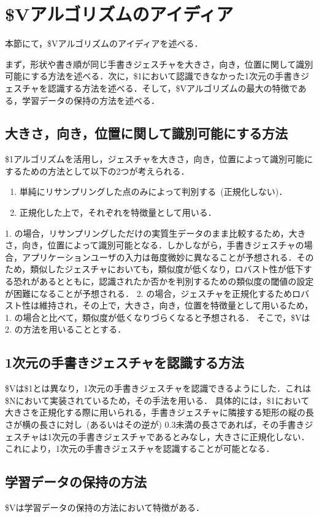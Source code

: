 \section{\$Vアルゴリズムのアイディア}
本節にて，\$Vアルゴリズムのアイディアを述べる．

まず，形状や書き順が同じ手書きジェスチャを大きさ，向き，位置に関して識別可能にする方法を述べる．次に，\$1において認識できなかった1次元の手書きジェスチャを認識する方法を述べる．そして，\$Vアルゴリズムの最大の特徴である，学習データの保持の方法を述べる．

\subsection{大きさ，向き，位置に関して識別可能にする方法}
\$1アルゴリズムを活用し，ジェスチャを大きさ，向き，位置によって識別可能にするための方法として以下の2つが考えられる．
\begin{enumerate}
\item 単純にリサンプリングした点のみによって判別する~(正規化しない)．
\item 正規化した上で，それぞれを特徴量として用いる．
\end{enumerate}
1. の場合，リサンプリングしただけの実質生データのまま比較するため，大きさ，向き，位置によって識別可能となる．しかしながら，手書きジェスチャの場合，アプリケーションユーザの入力は毎度微妙に異なることが予想される．そのため，類似したジェスチャにおいても，類似度が低くなり，ロバスト性が低下する恐れがあるとともに，認識されたか否かを判別するための類似度の閾値の設定が困難になることが予想される．
2. の場合，ジェスチャを正規化するためロバスト性は維持され，その上で，大きさ，向き，位置を特徴量として用いるため，1. の場合と比べて，類似度が低くなりづらくなると予想される．
そこで，\$Vは2. の方法を用いることとする．

\subsection{1次元の手書きジェスチャを認識する方法}
\$Vは\$1とは異なり，1次元の手書きジェスチャを認識できるようにした．これは\$N\cite{Anthony:2010:LMR:1839214.1839258}において実装されているため，その手法を用いる．
具体的には，\$1において大きさを正規化する際に用いられる，手書きジェスチャに隣接する矩形の縦の長さが横の長さに対し~(あるいはその逆が) 0.3未満の長さであれば，その手書きジェスチャは1次元の手書きジェスチャであるとみなし，大きさに正規化しない．これにより，1次元の手書きジェスチャを認識することが可能となる．

\subsection{学習データの保持の方法}
\$Vは学習データの保持の方法において特徴がある．

